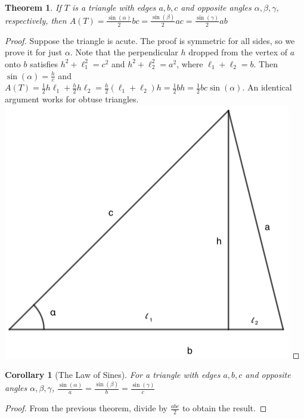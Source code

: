 \documentclass[oneside]{book}
\theoremstyle{mystyle}
\newtheorem{theorem}{Theorem}[section]
\newtheorem{corollary}{Corollary}[section]
\begin{document}
\begin{theorem}
If $T$ is a triangle with edges $a,b,c$ and opposite angles $\alpha,\beta,\gamma$, respectively, then $A(T) = \frac{\sin(\alpha)}{2}bc = \frac{\sin(\beta)}{2}ac = \frac{\sin(\gamma)}{2}ab$
\end{theorem}
\begin{proof}
Suppose the triangle is acute. The proof is symmetric for all sides, so we prove it for just $\alpha$. Note that the perpendicular $h$ dropped from the vertex of $a$ onto $b$ satisfies $h^2+\ell_1^2 = c^2$ and $h^2+\ell_2^2 = a^2$, where $\ell_1+\ell_2 = b$. Then $\sin(\alpha) = \frac{h}{c}$ and $A(T) = \frac{1}{2}h\ell_1 + \frac{h}{2}h\ell_2 = \frac{h}{2}(\ell_1+\ell_2)h = \frac{1}{2}bh = \frac{1}{2}bc\sin(\alpha)$. An identical argument works for obtuse triangles.
\includegraphics[scale=0.3]{triangle-1.png}
\end{proof}

\begin{corollary}[The Law of Sines]
For a triangle with edges $a,b,c$ and opposite angles $\alpha,\beta,\gamma$, $\frac{\sin(\alpha)}{a} = \frac{\sin(\beta)}{b} = \frac{\sin(\gamma)}{c}$
\end{corollary}
\begin{proof}
From the previous theorem, divide by $\frac{abc}{2}$ to obtain the result.
\end{proof}
\end{document}
